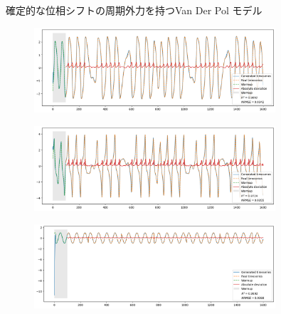 \begin{frame}{確定的な位相シフトの周期外力を持つVan Der Pol モデル}    
    \begin{minipage}{0.49\textwidth}
        
        \vspace{0.5em}
            \begin{figure}
                \includegraphics[width=0.8\textwidth]{Fig/output1.png}
                \label{rossler_+sin_alt_dshift_1.png} %
            \end{figure}
            \vspace{-1.0cm}
            \begin{figure}
                \includegraphics[width=0.8\textwidth]{Fig/output2.png}
                \label{rossler_+sin_alt_dshift_2.png} %
            \end{figure}
            \vspace{-1.0cm}
            \begin{figure}
                \includegraphics[width=0.8\textwidth]{Fig/output3.png}
                \label{rossler_+sin_alt_dshift_3.png} %
            \end{figure}
            \vspace{-1.0cm}

        \end{minipage}
    \begin{minipage}{0.5\textwidth}
    \end{minipage}
\end{frame}


